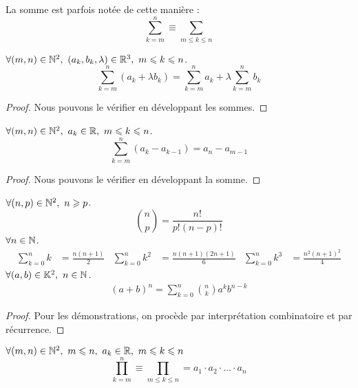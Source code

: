 \begin{notation}
    La somme est parfois notée de cette manière :
    \[ \sum_{k = m}^n \equiv \sum_{m \leq k \leq n} \]
\end{notation}

\begin{proposition}
    $\forall (m, n) \in \mathbb{N}^2,\ (a_k, b_k, \lambda) \in \mathbb{R}^3,\ m \leqslant k \leqslant n$.
    \[ \sum_{k = m}^{n} (a_k + \lambda b_k) = \sum_{k = m}^n a_k + \lambda \sum_{k = m}^n b_k \]
\end{proposition}

\begin{proof}
	Nous pouvons le vérifier en développant les sommes.
\end{proof}

\begin{proposition}
    $\forall (m, n) \in \mathbb{N}^2,\ a_k \in \mathbb{R},\ m \leqslant k \leqslant n$.
    \[ \sum_{k = m}^n (a_k - a_{k - 1}) = a_n - a_{m - 1} \]
\end{proposition}

\begin{proof}
	Nous pouvons le vérifier en développant la somme.
\end{proof}

\begin{proposition}
	$\forall (n, p) \in \mathbb{N}^2,\ n \geqslant p$.
	\[ \binom{n}{p} = \frac{n!}{p!(n - p)!} \]
	$\forall n \in \mathbb{N}$.
	\begin{align*}
		\sum_{k = 0}^{n} k &= \frac{n(n+1)}{2} & 
		\sum_{k = 0}^{n} k^2 &= \frac{n(n+1)(2n+1)}{6} &
		\sum_{k = 0}^{n} k^3 &= \frac{n^2(n+1)^2}{4}
	\end{align*}
	$\forall (a, b) \in \mathbb{K}^2,\ n \in \mathbb{N}$.
	\begin{align*}
		(a + b)^n = \sum_{k = 0}^{n} \binom{n}{k} a^kb^{n-k}
	\end{align*}
\end{proposition}
\begin{proof}
    Pour les démonstrations, on procède par interprétation combinatoire et par récurrence.
\end{proof}

\begin{definition}[Produit]
    $\forall (m, n) \in \mathbb{N}^2,\ m \leqslant n,\ a_k \in \mathbb{R},\ m \leqslant k \leqslant n$
    \[ \prod_{k = m}^{n} \equiv \prod_{m \leq k \leq n} = a_1 \cdot a_2 \cdot \ldots \cdot a_n \]
\end{definition}